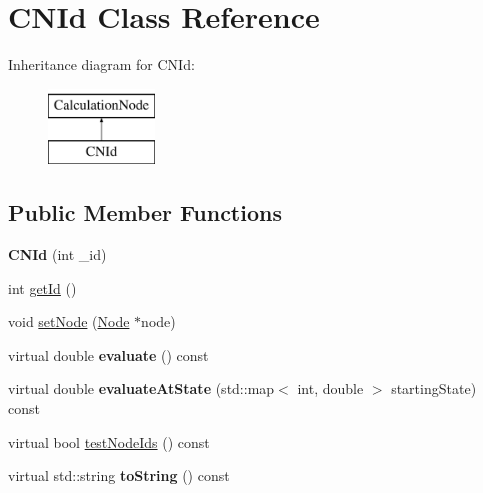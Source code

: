 \hypertarget{classCNId}{}\section{C\+N\+Id Class Reference}
\label{classCNId}
Inheritance diagram for C\+N\+Id\+:\begin{figure}[H]
\begin{center}
\leavevmode
\includegraphics[height=2.000000cm]{classCNId}
\end{center}
\end{figure}
\subsection*{Public Member Functions}
\begin{DoxyCompactItemize}
\item 
{\bfseries C\+N\+Id} (int \+\_\+id)\hypertarget{classCNId_ad36125d5115c0c75783a23e1e4ad55b2}{}\label{classCNId_ad36125d5115c0c75783a23e1e4ad55b2}

\item 
int \hyperlink{classCNId_ae0c2d402de892ef8783e6f5281ece008}{get\+Id} ()
\item 
void \hyperlink{classCNId_a25b7d25adf35e61b0d1b0e67862354f4}{set\+Node} (\hyperlink{classNode}{Node} $\ast$node)
\item 
virtual double {\bfseries evaluate} () const \hypertarget{classCNId_a5f6b3bbc1a6daaef9a11cdc80aff920c}{}\label{classCNId_a5f6b3bbc1a6daaef9a11cdc80aff920c}

\item 
virtual double {\bfseries evaluate\+At\+State} (std\+::map$<$ int, double $>$ starting\+State) const \hypertarget{classCNId_aacf48e3e3766cc1d54a9af8532d747ec}{}\label{classCNId_aacf48e3e3766cc1d54a9af8532d747ec}

\item 
virtual bool \hyperlink{classCNId_a0bc1a04e94dfbb047ad53dd6682bf071}{test\+Node\+Ids} () const 
\item 
virtual std\+::string {\bfseries to\+String} () const \hypertarget{classCNId_ae853b898d20c008bdddf799ed971f30a}{}\label{classCNId_ae853b898d20c008bdddf799ed971f30a}

\end{DoxyCompactItemize}
